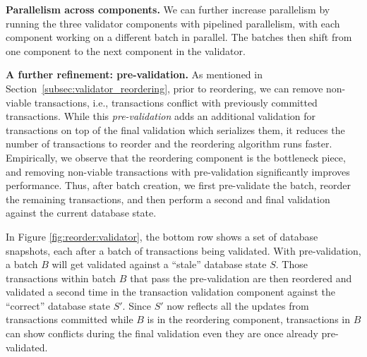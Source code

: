 {\bf Parallelism across components.}
We can further increase parallelism by running the three validator components with pipelined parallelism, 
with each component working on a different batch in parallel. The batches then shift from one component to the next component in the validator.

{\bf A further refinement: pre-validation.} As mentioned in Section~\ref{subsec:validator_reordering}, prior to reordering, we can remove non-viable transactions, i.e., transactions conflict with previously committed transactions. While this \emph{pre-validation} adds an additional validation for transactions on top of the final validation which serializes them, it reduces the number of transactions to reorder and the reordering algorithm runs faster. Empirically, we observe that the reordering component is the bottleneck piece, and removing non-viable transactions with pre-validation significantly improves performance. Thus, after batch creation, we first pre-validate the batch, reorder the remaining transactions, and then perform a second and final validation against the current database state.

In Figure \ref{fig:reorder:validator}, the bottom row shows a set of database snapshots, each after a batch of transactions being validated. With pre-validation, a batch $B$ will get validated against a ``stale'' database state $S$. Those transactions within batch $B$ that pass the pre-validation are then reordered and validated a second time in the transaction validation component against the ``correct'' database state $S'$. Since $S'$ now reflects all the updates from transactions committed while $B$ is in the reordering component, transactions in $B$ can show conflicts during the final validation even  they are once already pre-validated.



